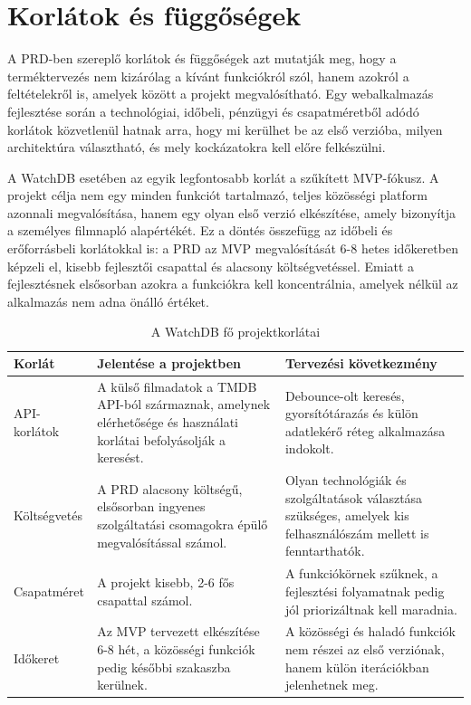 \section{Korlátok és függőségek}

A PRD-ben szereplő korlátok és függőségek azt mutatják meg, hogy a terméktervezés nem kizárólag a kívánt funkciókról szól, hanem azokról a feltételekről is, amelyek között a projekt megvalósítható. Egy webalkalmazás fejlesztése során a technológiai, időbeli, pénzügyi és csapatméretből adódó korlátok közvetlenül hatnak arra, hogy mi kerülhet be az első verzióba, milyen architektúra választható, és mely kockázatokra kell előre felkészülni.

A WatchDB esetében az egyik legfontosabb korlát a szűkített MVP-fókusz. A projekt célja nem egy minden funkciót tartalmazó, teljes közösségi platform azonnali megvalósítása, hanem egy olyan első verzió elkészítése, amely bizonyítja a személyes filmnapló alapértékét. Ez a döntés összefügg az időbeli és erőforrásbeli korlátokkal is: a PRD az MVP megvalósítását 6-8 hetes időkeretben képzeli el, kisebb fejlesztői csapattal és alacsony költségvetéssel. Emiatt a fejlesztésnek elsősorban azokra a funkciókra kell koncentrálnia, amelyek nélkül az alkalmazás nem adna önálló értéket.

\begin{table}[H]
\centering
\renewcommand{\arraystretch}{1.25}
\begin{tabular}{|p{}|p{}|p{}|}
\hline
\textbf{Korlát} & \textbf{Jelentése a projektben} & \textbf{Tervezési következmény} \\
\hline
API-korlátok & A külső filmadatok a TMDB API-ból származnak, amelynek elérhetősége és használati korlátai befolyásolják a keresést. & Debounce-olt keresés, gyorsítótárazás és külön adatlekérő réteg alkalmazása indokolt. \\
\hline
Költségvetés & A PRD alacsony költségű, elsősorban ingyenes szolgáltatási csomagokra épülő megvalósítással számol. & Olyan technológiák és szolgáltatások választása szükséges, amelyek kis felhasználószám mellett is fenntarthatók. \\
\hline
Csapatméret & A projekt kisebb, 2-6 fős csapattal számol. & A funkciókörnek szűknek, a fejlesztési folyamatnak pedig jól priorizáltnak kell maradnia. \\
\hline
Időkeret & Az MVP tervezett elkészítése 6-8 hét, a közösségi funkciók pedig későbbi szakaszba kerülnek. & A közösségi és haladó funkciók nem részei az első verziónak, hanem külön iterációkban jelenhetnek meg. \\
\hline
\end{tabular}
\caption{A WatchDB fő projektkorlátai}
\label{tab:watchdb-constraints}
\end{table}

